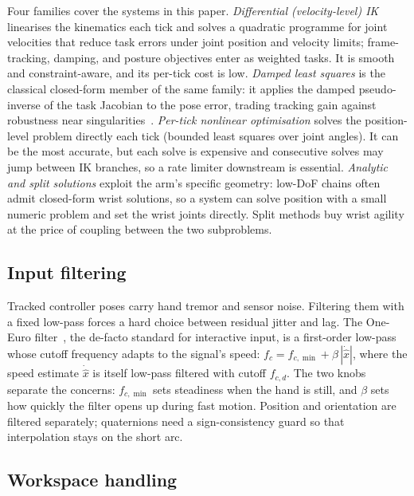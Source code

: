 Four families cover the systems in this paper.
\emph{Differential (velocity-level) IK} linearises the kinematics each
tick and solves a quadratic programme for joint velocities that reduce
task errors under joint position and velocity limits; frame-tracking,
damping, and posture objectives enter as weighted tasks. It is smooth
and constraint-aware, and its per-tick cost is low.
\emph{Damped least squares} is the classical closed-form member of the
same family: it applies the damped pseudo-inverse of the task Jacobian
to the pose error, trading tracking gain against robustness near
singularities~\citep{wampler1986,nakamura1986}.
\emph{Per-tick nonlinear optimisation} solves the position-level problem
directly each tick (bounded least squares over joint angles). It can be
the most accurate, but each solve is expensive and consecutive solves
may jump between IK branches, so a rate limiter downstream is essential.
\emph{Analytic and split solutions} exploit the arm's specific geometry:
low-DoF chains often admit closed-form wrist solutions, so a system can
solve position with a small numeric problem and set the wrist joints
directly. Split methods buy wrist agility at the price of coupling
between the two subproblems.

\subsection{Input filtering}
\label{sec:prelim-filter}

Tracked controller poses carry hand tremor and sensor noise. Filtering
them with a fixed low-pass forces a hard choice between residual jitter
and lag. The One-Euro filter~\citep{oneeuro}, the de-facto standard for
interactive input, is a first-order low-pass whose cutoff frequency
adapts to the signal's speed:
\(f_c = f_{c,\min} + \beta\,|\dot{\hat x}|\), where the speed estimate
\(\dot{\hat x}\) is itself low-pass filtered with cutoff \(f_{c,d}\).
The two knobs separate the concerns: \(f_{c,\min}\) sets steadiness when
the hand is still, and \(\beta\) sets how quickly the filter opens up
during fast motion. Position and orientation are filtered separately;
quaternions need a sign-consistency guard so that interpolation stays on
the short arc.

\subsection{Workspace handling}
\label{sec:prelim-workspace}

